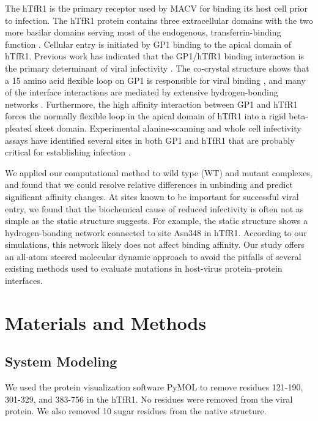 \documentclass[12pt]{article}
\begin{document}
The hTfR1 is the primary receptor used by MACV for binding its host cell prior to infection. The hTfR1 protein contains three extracellular domains with the two more basilar domains serving most of the endogenous, transferrin-binding function \citep{Abraham2010,Rad20112}. Cellular entry is initiated by GP1 binding to the apical domain of hTfR1. Previous work has indicated that the GP1/hTfR1 binding interaction is the primary determinant of viral infectivity \citep{Rad20111,Rad20112}. The co-crystal structure shows that a 15 amino acid flexible loop on GP1 is responsible for viral binding \citep{Abraham2010,Rad20112}, and many of the interface interactions are mediated by extensive hydrogen-bonding networks \citep{Abraham2010}. Furthermore, the high affinity interaction between GP1 and hTfR1 forces the normally flexible loop in the apical domain of hTfR1 into a rigid beta-pleated sheet domain. Experimental alanine-scanning and whole cell infectivity assays have identified several sites in both GP1 and hTfR1 that are probably critical for establishing infection \citep{Rad20111,Rad20112}.

We applied our computational method to wild type (WT) and mutant complexes, and found that we could resolve relative differences in unbinding and predict significant affinity changes. At sites known to be important for successful viral entry, we found that the biochemical cause of reduced infectivity is often not as simple as the static structure suggests. For example, the static structure shows a hydrogen-bonding network connected to site Asn348 in hTfR1. According to our simulations, this network likely does not affect binding affinity. Our study offers an all-atom steered molecular dynamic approach to avoid the pitfalls of several existing methods used to evaluate mutations in host-virus protein--protein interfaces.

\section*{Materials and Methods}

\subsection*{System Modeling}

We used the protein visualization software PyMOL \citep{PyMOL} to remove residues 121-190, 301-329, and 383-756 in the hTfR1. No residues were removed from the viral protein. We also removed 10 sugar residues from the native structure.
\end{document}
